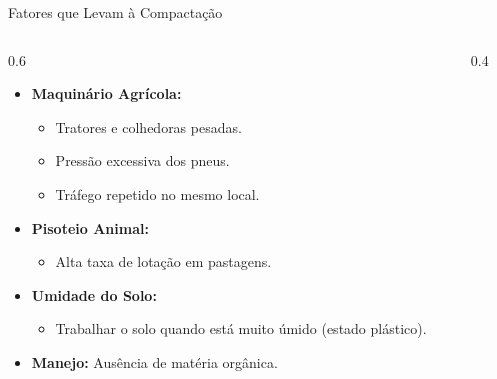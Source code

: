\documentclass[9pt]{beamer}
\begin{document}
\begin{frame}{Fatores que Levam à Compactação}
    \begin{columns}
        \begin{column}{0.6\textwidth}
            \begin{itemize}
                \item \textbf{Maquinário Agrícola:}
                \begin{itemize}
                    \item Tratores e colhedoras pesadas.
                    \item Pressão excessiva dos pneus.
                    \item Tráfego repetido no mesmo local.
                \end{itemize}
                \item \textbf{Pisoteio Animal:}
                \begin{itemize}
                    \item Alta taxa de lotação em pastagens.
                \end{itemize}
                \item \textbf{Umidade do Solo:}
                \begin{itemize}
                    \item Trabalhar o solo quando está muito úmido (estado plástico).
                \end{itemize}
                \item \textbf{Manejo:} Ausência de matéria orgânica.
            \end{itemize}
        \end{column}
        \begin{column}{0.4\textwidth}
        \end{column}
    \end{columns}
\end{frame}
\end{document}
